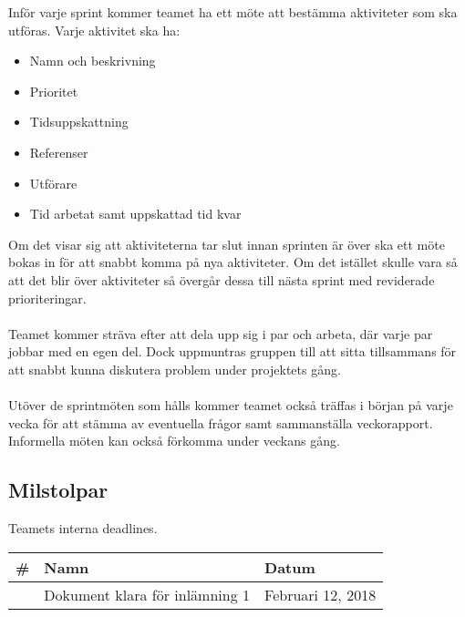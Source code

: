Inför varje sprint kommer teamet ha ett möte att bestämma aktiviteter som ska utföras. Varje aktivitet ska ha: \begin{itemize}
    \item Namn och beskrivning
    \item Prioritet
    \item Tidsuppskattning
    \item Referenser
    \item Utförare
    \item Tid arbetat samt uppskattad tid kvar
\end{itemize}
Om det visar sig att aktiviteterna tar slut innan sprinten är över ska ett möte bokas in för att snabbt komma på nya aktiviteter. Om det istället skulle vara så att det blir över aktiviteter så övergår dessa till nästa sprint med reviderade prioriteringar.\\
\\
Teamet kommer sträva efter att dela upp sig i par och arbeta, där varje par jobbar med en egen del. Dock uppmuntras
gruppen till att sitta tillsammans för att snabbt kunna diskutera problem under projektets gång.\\
\\
Utöver de sprintmöten som hålls kommer teamet också träffas i början på varje vecka för att stämma av eventuella frågor samt sammanställa veckorapport. Informella möten kan också förkomma under veckans gång.

\subsection{Milstolpar}
Teamets interna deadlines.

\begin{center}
    \begin{tabular}{| l | l | l | }
        \hline
        \textbf{\#} & \textbf{Namn} & \textbf{Datum} \\
        \hline
        \centering 1 & Dokument klara för inlämning 1 & Februari 12, 2018\\
        \hline
    \end{tabular}
\end{center}

